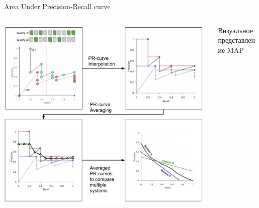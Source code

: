 \documentclass[11pt,aspectratio=169,handout]{beamer}
\begin{document}
\begin{frame}{Area Under Precision-Recall curve}

\begin{columns}
\begin{column}{0.5\textwidth}
   \begin{center}
		\includegraphics[scale=0.13]{images/auprc.png}
   \end{center}
\end{column}
\begin{column}{0.4\textwidth}
    \begin{tcolorbox}[colback=gray!5,colframe=gray!80,title=]
      Визуальное представление MAP
    \end{tcolorbox}
\end{column}
\end{columns}

\end{frame}
\end{document}
